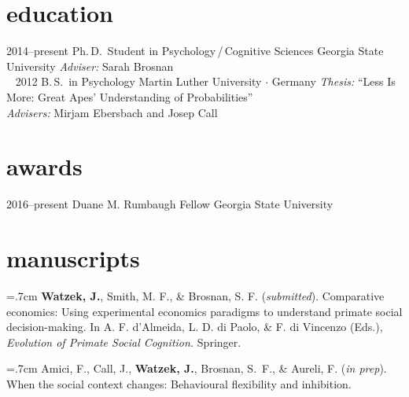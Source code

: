 \documentclass[]{friggeri-cv}
\begin{document}
\section{education}

\begin{entrylist}
  \entry
    {2014--present}
    {Ph.\,D.~Student in Psychology\,/\,Cognitive Sciences}
    {Georgia State University}
    {\emph{Adviser:} Sarah Brosnan\\~}
  \entry
    {2012}
    {B.\,S.~in Psychology}
    {Martin Luther University $\cdot$ Germany}
    {\emph{Thesis:} ``Less Is More: Great Apes' Understanding of Probabilities''\\
    \emph{Advisers:} Mirjam Ebersbach and Josep Call}
\end{entrylist}

%

\section{awards}

\begin{entrylist}
  \entry
    {2016--present}
    {Duane M. Rumbaugh Fellow}
    {Georgia State University}
    {}
\end{entrylist}

\section{manuscripts}

\hangindent=.7cm \textbf{Watzek, J.}, Smith, M. F., \& Brosnan, S. F. (\emph{submitted}). Comparative economics: Using experimental economics paradigms to understand primate social decision-making. In A. F. d'Almeida, L. D. di Paolo, \& F. di Vincenzo (Eds.), \emph{Evolution of Primate Social Cognition.} Springer.

\hangindent=.7cm Amici, F., Call, J., \textbf{Watzek, J.}, Brosnan, S.~F., \& Aureli, F. (\emph{in prep}). When the social context changes: Behavioural flexibility and inhibition.
\end{document}
